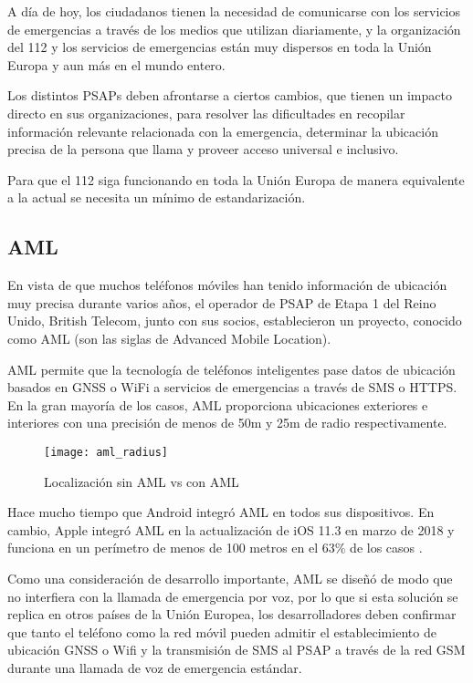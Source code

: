 A día de hoy, los ciudadanos tienen la necesidad de comunicarse con los servicios de emergencias a través de los medios que utilizan diariamente, y la organización del 112 y los servicios de emergencias están muy dispersos en toda la Unión Europa y aun más en el mundo entero.

Los distintos PSAPs deben afrontarse a ciertos cambios, que tienen un impacto directo en sus organizaciones, para resolver las dificultades en recopilar información relevante relacionada con la emergencia, determinar la ubicación precisa de la persona que llama y proveer acceso universal e inclusivo.

Para que el 112 siga funcionando en toda la Unión Europa de manera equivalente a la actual se necesita un mínimo de estandarización.

\subsection{AML}

En vista de que muchos teléfonos móviles han tenido información de ubicación muy precisa durante varios años, el operador de PSAP de Etapa 1 del Reino Unido, British Telecom, junto con sus socios, establecieron un proyecto, conocido como AML (son las siglas de Advanced Mobile Location).

AML permite que la tecnología de teléfonos inteligentes pase datos de ubicación basados en GNSS o WiFi a servicios de emergencias a través de SMS o HTTPS. En la gran mayoría de los casos, AML proporciona ubicaciones exteriores e interiores con una precisión de menos de 50m y 25m de radio respectivamente.

\begin{figure}[htp!]
  \centering
  \texttt{[image: aml\_radius]}
  \caption{Localización sin AML vs con AML}
  \label{fig:aml_radius}
\end{figure}

Hace mucho tiempo que Android integró AML en todos sus dispositivos. En cambio, Apple integró AML en la actualización de iOS 11.3 en marzo de 2018 y funciona en un perímetro de menos de 100 metros en el 63\% de los casos \cite{aml6}.

Como una consideración de desarrollo importante, AML se diseñó de modo que no interfiera con la llamada de emergencia por voz, por lo que si esta solución se replica en otros países de la Unión Europea, los desarrolladores deben confirmar que tanto el teléfono como la red móvil pueden admitir el establecimiento de ubicación GNSS o Wifi y la transmisión de SMS al PSAP a través de la red GSM durante una llamada de voz de emergencia estándar.

